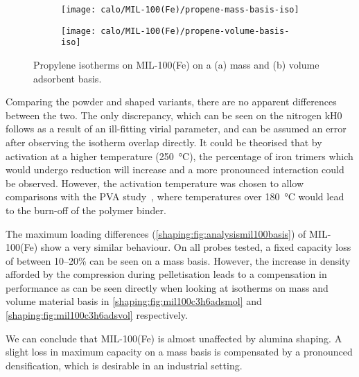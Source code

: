 \begin{figure}[htb]
	\centering
	\begin{subfigure}{0.45\textwidth}
		\texttt{[image: calo/MIL-100(Fe)/propene-mass-basis-iso]}
		\caption{}%
		\label{shaping:fig:mil100c3h6adsmol}
	\end{subfigure}%
	\begin{subfigure}{0.45\textwidth}
		\texttt{[image: calo/MIL-100(Fe)/propene-volume-basis-iso]}
		\caption{}%
		\label{shaping:fig:mil100c3h6adsvol}
	\end{subfigure}%
	\caption{Propylene isotherms on MIL-100(Fe) on a (a) mass
		and (b) volume adsorbent basis.}%
	\label{shaping:fig:mil100isotherms}
\end{figure}

Comparing the powder and shaped variants, there are no
apparent differences between the two. The only discrepancy,
which can be seen on the nitrogen \gls{kH0} follows
as a result of an ill-fitting virial parameter,
and can be assumed an error after observing the isotherm
overlap directly. It could be theorised that by activation at
a higher temperature (\SI{250}{\degreeCelsius}),
the percentage of iron trimers which would undergo reduction will
increase and a more pronounced interaction could be observed.
However, the activation temperature was chosen to allow
comparisons with the \gls{PVA} study~\cite{chanutObservingEffectsShaping2016},
where temperatures over \SI{180}{\degreeCelsius} would lead to the
burn-off of the polymer binder.

The maximum loading differences (\autoref{shaping:fig:analysismil100basis})
of MIL-100(Fe) show a very similar behaviour.
On all probes tested, a fixed capacity
loss of between 10--20\% can be seen on a mass
basis. However, the increase in density afforded by the
compression during pelletisation leads to a compensation in
performance as can be seen directly when looking at isotherms on mass and
volume material basis in \autoref{shaping:fig:mil100c3h6adsmol} and
\autoref{shaping:fig:mil100c3h6adsvol} respectively.

We can conclude that MIL-100(Fe) is almost unaffected by alumina shaping.
A slight loss in maximum capacity on a mass basis is compensated by a 
pronounced densification, which is desirable in an industrial setting.
